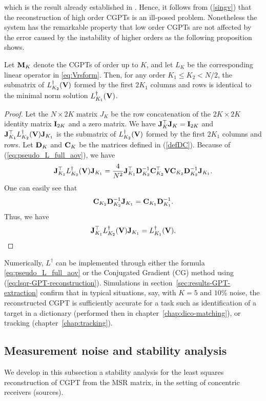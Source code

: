 which is the result already established in
\cite{ABGJKW2012dico}. Hence, it follows from (\ref{singv})
that the reconstruction of high order CGPTs is an ill-posed
problem. Nonetheless the system has the remarkable property that
low order CGPTs are not affected by the error caused by the
instability of higher orders as the following proposition shows.
\begin{proposition}
  Let $\mathbf{M}_K$ denote the CGPTs of order up to $K$, and let $L_K$ be the corresponding linear operator in
  \eqref{eq:Vrsform}. Then, for any order $K_1\leq K_2<N/2$, the submatrix of
  $L_{K_2}^\dagger(\mathbf{V})$ formed by the first $2K_1$ columns and rows is identical to the minimal
  norm solution $L_{K_1}^\dagger(\mathbf{V})$.
\end{proposition}
\begin{proof}
  Let the $N\times 2K$ matrix $J_K$ be the row concatenation of the $2K\times 2K$ identity matrix $\mathbf{I}_{2K}$ and
  a zero matrix.
We have $\mathbf{J}_K^\top \mathbf{J}_K=\mathbf{I}_{2K}$ and $\mathbf{J}_{K_1}^\top
L_{K_2}^\dagger(\mathbf{V}) \mathbf{J}_{K_1}$ is the submatrix of
$L_{K_2}^\dagger(\mathbf{V})$ formed by the first $2K_1$ columns and
rows. Let $\mathbf{D}_K$  and $\mathbf{C}_K$ be the matrices defined in
(\ref{defDC}). Because of (\ref{eq:pseudo_L_full_aov}), we have
$$
\mathbf{J}_{K_1}^\top L_{K_2}^\dagger(\mathbf{V}) \mathbf{J}_{K_1} =  \frac{4}{N^2}
\mathbf{J}_{K_1}^\top \mathbf{D}_{K_2}^{-1} \mathbf{C}_{K_2}^\top \mathbf{V}  \mathbf{C}_{K_2}
\mathbf{D}_{K_2}^{-1}  \mathbf{J}_{K_1}.
$$
One can easily see that
$$
\mathbf{C}_{K_2} \mathbf{D}_{K_2}^{-1}  \mathbf{J}_{K_1} = \mathbf{C}_{K_1} \mathbf{D}_{K_1}^{-1}.
$$
Thus, we have
$$
\mathbf{J}_{K_1}^\top L_{K_2}^\dagger(\mathbf{V}) \mathbf{J}_{K_1} =
L_{K_1}^\dagger(\mathbf{V}).
$$
\end{proof}
Numerically,  $L^\dagger$ can be implemented through either the
formula \eqref{eq:pseudo_L_full_aov} or the Conjugated Gradient
(CG) method using  (\ref{eq:lsqr-GPT-reconstruction}). Simulations
in section~\ref{sec:results-GPT-extraction} confirm that in typical situations,
say, with $K=5$ and $10\%$ noise, the reconstructed CGPT is
sufficiently accurate for a task such as identification of a
target in a dictionary (performed then in chapter~\ref{chap:dico-matching}),
or tracking (chapter~\ref{chap:tracking}).

\subsection{Measurement noise and stability analysis}

\label{sub:electronic-noise}

We develop in this subsection a stability analysis for
the least squares reconstruction of CGPT from the MSR matrix, in
the setting of concentric receivers (sources).

